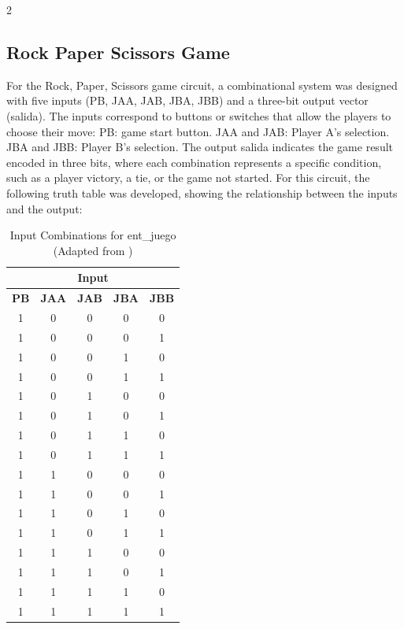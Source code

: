 \documentclass{article}
\begin{document}
\begin{multicols}{2}
\subsection{Rock Paper Scissors Game}\label{R,P,S Game}
For the Rock, Paper, Scissors game circuit, a combinational system was designed with five inputs (PB, JAA, JAB, JBA, JBB) and a three-bit output vector (salida). The inputs correspond to buttons or switches that allow the players to choose their move: 
PB: game start button. 
JAA and JAB: Player A’s selection. 
JBA and JBB: Player B’s selection. 
The output salida indicates the game result encoded in three bits, where each combination represents a specific condition, such as a player victory, a tie, or the game not started. For this circuit, the following truth table was developed, showing the relationship between the inputs and the output: 

\begin{table}[H]
\centering
\begin{tabular}{|c|c|c|c|c|}
\hline
\multicolumn{5}{|c|}{\textbf{Input}} \\
\hline
\textbf{PB} & \textbf{JAA} & \textbf{JAB} & \textbf{JBA} & \textbf{JBB} \\
\hline
1 & 0 & 0 & 0 & 0 \\
1 & 0 & 0 & 0 & 1 \\
1 & 0 & 0 & 1 & 0 \\
1 & 0 & 0 & 1 & 1 \\
1 & 0 & 1 & 0 & 0 \\
1 & 0 & 1 & 0 & 1 \\
1 & 0 & 1 & 1 & 0 \\
1 & 0 & 1 & 1 & 1 \\
1 & 1 & 0 & 0 & 0 \\
1 & 1 & 0 & 0 & 1 \\
1 & 1 & 0 & 1 & 0 \\
1 & 1 & 0 & 1 & 1 \\
1 & 1 & 1 & 0 & 0 \\
1 & 1 & 1 & 0 & 1 \\
1 & 1 & 1 & 1 & 0 \\
1 & 1 & 1 & 1 & 1 \\
\hline
\end{tabular}
\caption{Input Combinations for ent\_juego (Adapted from )}
\label{tab:vhdl_juego_inputs}
\end{table}


\end{multicols}
\end{document}

